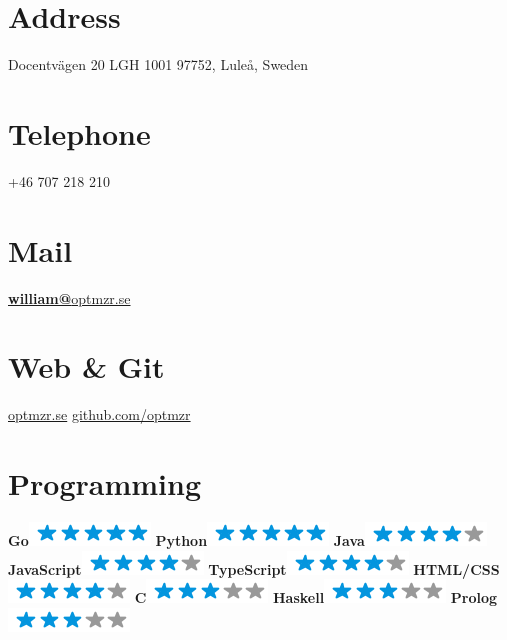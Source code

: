 \documentclass[]{friggeri-cv}
\begin{document}

\begin{aside}
  \section{Address}
    Docentvägen 20 LGH 1001
    97752, Luleå, Sweden
    ~
  \section{Telephone}
    +46 707 218 210
    ~
  \section{Mail}
    \href{mailto:william@optmzr.se}{\textbf{william@}optmzr.se}
    ~
  \section{Web \& Git}
    \href{https://optmzr.se}{optmzr.se}
    \href{https://github.com/optmzr}{github.com/optmzr}
    ~
  \section{Programming}
    \textbf{Go}\includegraphics[scale=0.40]{img/5stars.png}
    \textbf{Python}\includegraphics[scale=0.40]{img/5stars.png}
    \textbf{Java}\includegraphics[scale=0.40]{img/4stars.png}
    \textbf{JavaScript}\includegraphics[scale=0.40]{img/4stars.png}
    \textbf{TypeScript}\includegraphics[scale=0.40]{img/4stars.png}
    \textbf{HTML/CSS}\includegraphics[scale=0.40]{img/4stars.png}
    \textbf{C}\includegraphics[scale=0.40]{img/3stars.png}
    \textbf{Haskell}\includegraphics[scale=0.40]{img/3stars.png}
    \textbf{Prolog}\includegraphics[scale=0.40]{img/3stars.png}
    ~

\end{aside}
\end{document}
